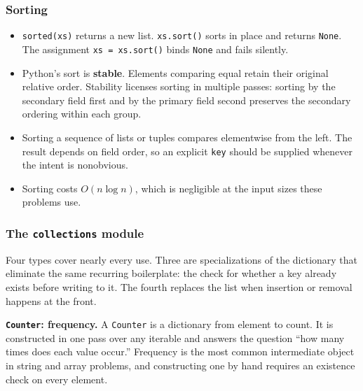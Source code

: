 
\newpage
\subsubsection*{Sorting}

\begin{itemize}[itemsep=-0.5ex]
  \item \texttt{sorted(xs)} returns a new list. \texttt{xs.sort()} sorts in
        place and returns \texttt{None}. The assignment \texttt{xs = xs.sort()}
        binds \texttt{None} and fails silently.
  \item Python's sort is \textbf{stable}. Elements comparing equal retain
        their original relative order. Stability licenses sorting in multiple
        passes: sorting by the secondary field first and by the primary field
        second preserves the secondary ordering within each group.
  \item Sorting a sequence of lists or tuples compares elementwise from the
        left. The result depends on field order, so an explicit \texttt{key}
        should be supplied whenever the intent is nonobvious.
  \item Sorting costs $O(n \log n)$, which is negligible at the input sizes
        these problems use.
\end{itemize}

\subsubsection*{The \texttt{collections} module}

Four types cover nearly every use. Three are specializations of the
dictionary that eliminate the same recurring boilerplate: the check for
whether a key already exists before writing to it. The fourth replaces the
list when insertion or removal happens at the front.

\medskip

\noindent\textbf{\texttt{Counter}: frequency.}
A \texttt{Counter} is a dictionary from element to count. It is constructed in
one pass over any iterable and answers the question ``how many times does each
value occur.'' Frequency is the most common intermediate object in string and
array problems, and constructing one by hand requires an existence check on
every element.

